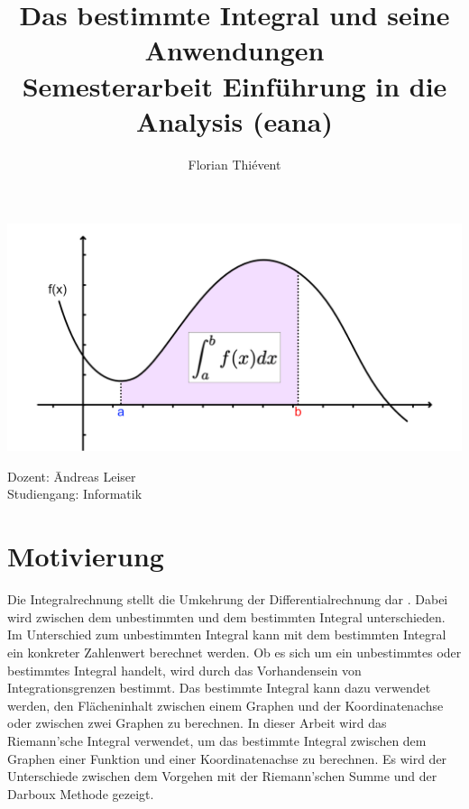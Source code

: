 \documentclass{fhnwreport} %
\title{%
  {\huge Das bestimmte Integral und seine Anwendungen}\\[2ex]
  {\large Semesterarbeit Einführung in die Analysis (eana)}}
\author{Florian Thiévent}
\begin{document}
\maketitle

\vfill

\begin{minipage}{\textwidth}
\begin{center}
\vspace*{5ex}
\includegraphics{titelbild}
\end{center}
\end{minipage}

\vfill

\begin{tabbing}
Dozent: \hspace{2em} \= Andreas Leiser \\[2ex]
Studiengang: \> Informatik
\end{tabbing}


\hbox{}

\clearpage

\tableofcontents
\clearpage

\section{Motivierung}
Die Integralrechnung stellt die Umkehrung der Differentialrechnung dar \cite{Bosch2010}. Dabei wird zwischen dem unbestimmten und dem bestimmten Integral unterschieden. Im Unterschied zum unbestimmten Integral kann mit dem bestimmten Integral ein konkreter Zahlenwert berechnet werden. Ob es sich um ein unbestimmtes oder bestimmtes Integral handelt, wird durch das Vorhandensein von Integrationsgrenzen bestimmt. Das bestimmte Integral kann dazu verwendet werden, den Flächeninhalt zwischen einem Graphen und der Koordinatenachse oder zwischen zwei Graphen zu berechnen. In dieser Arbeit wird das Riemann'sche Integral verwendet, um das bestimmte Integral zwischen dem Graphen einer Funktion und einer Koordinatenachse zu berechnen. Es wird der Unterschiede zwischen dem Vorgehen mit der Riemann'schen Summe und der Darboux Methode gezeigt.
\end{document}
